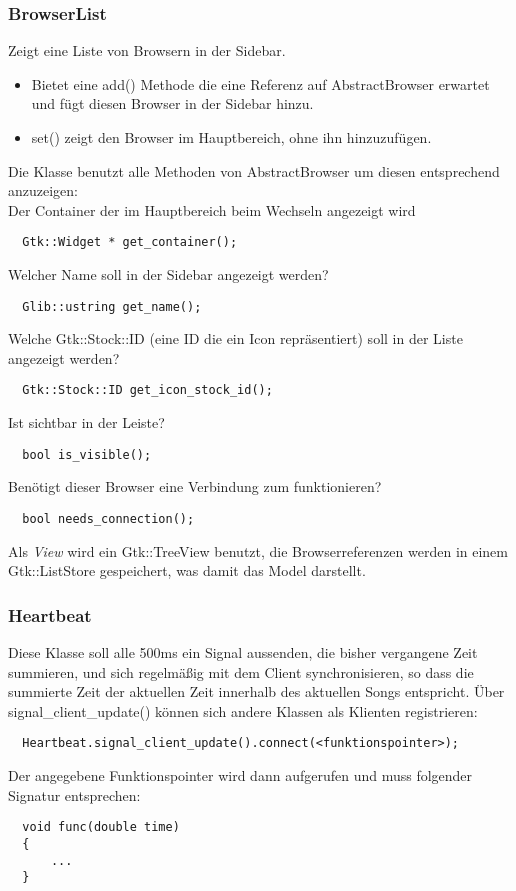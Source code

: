 \subsubsection{BrowserList}
%
%
%
Zeigt eine Liste von Browsern in der Sidebar.
\begin{itemize} 
\item Bietet eine add() Methode die eine Referenz auf AbstractBrowser erwartet und fügt diesen Browser in der Sidebar hinzu.
\item set() zeigt den Browser im Hauptbereich, ohne ihn hinzuzufügen.
\end{itemize}
Die Klasse benutzt alle Methoden von AbstractBrowser um diesen entsprechend anzuzeigen:
\\
Der Container der im Hauptbereich beim Wechseln angezeigt wird
\begin{verbatim}
  Gtk::Widget * get_container();
\end{verbatim}
Welcher Name soll in der Sidebar angezeigt werden?
\begin{verbatim}
  Glib::ustring get_name();
\end{verbatim}
Welche Gtk::Stock::ID (eine ID die ein Icon repräsentiert) soll in der Liste angezeigt werden?
\begin{verbatim}
  Gtk::Stock::ID get_icon_stock_id();
\end{verbatim} 
Ist sichtbar in der Leiste?
\begin{verbatim}
  bool is_visible(); 
\end{verbatim}
Benötigt dieser Browser eine Verbindung zum funktionieren?
\begin{verbatim}
  bool needs_connection(); 
\end{verbatim}

Als \emph{View} wird ein Gtk::TreeView benutzt, die Browserreferenzen werden in einem Gtk::ListStore gespeichert,
was damit das Model darstellt. 

\subsubsection{Heartbeat}
%
%
%
Diese Klasse soll alle 500ms ein Signal aussenden, die bisher vergangene Zeit summieren, und sich regelmäßig mit dem 
Client synchronisieren, so dass die summierte Zeit der aktuellen Zeit innerhalb des aktuellen Songs entspricht.
Über signal\_client\_update() können sich andere Klassen als Klienten registrieren:
\begin{verbatim}
  Heartbeat.signal_client_update().connect(<funktionspointer>);
\end{verbatim}
Der angegebene Funktionspointer wird dann aufgerufen und muss folgender Signatur entsprechen:
\begin{verbatim}
  void func(double time)
  {
      ...
  }
\end{verbatim}

